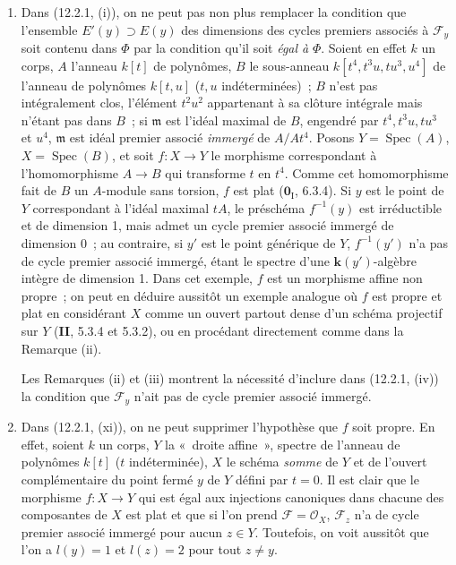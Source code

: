 \begin{remarks}[12.2.3]
\begin{enumerate}[label=(\roman*)]
  \item Dans (12.2.1, (i)), on ne peut pas non plus remplacer la condition que
  l'ensemble $E'(y)\supset E(y)$ des dimensions des cycles premiers associés à
  $\mathcal F_y$ soit contenu dans $\Phi$ par la condition qu'il soit
  \emph{égal à} $\Phi$. Soient en effet $k$ un corps, $A$ l'anneau $k[t]$ de
  polynômes, $B$ le sous-anneau $k[t^4,t^3u,tu^3,u^4]$ de l'anneau de polynômes
  $k[t,u]$ ($t,u$ indéterminées)~; $B$ n'est pas intégralement clos, l'élément
  $t^2u^2$ appartenant à sa clôture intégrale mais n'étant pas dans $B$~; si
  $\mathfrak m$ est l'idéal maximal de $B$, engendré par $t^4,t^3u,tu^3$ et
  $u^4$, $\mathfrak m$ est idéal premier associé \emph{immergé} de $A/At^4$. Posons
  $Y=\operatorname{Spec}(A)$, $X=\operatorname{Spec}(B)$, et soit $f:X\to Y$
  le morphisme correspondant à l'homomorphisme $A\to B$ qui transforme $t$ en
  $t^4$. Comme cet homomorphisme fait de $B$ un $A$-module sans torsion, $f$
  est plat ($\mathbf 0_{\mathrm I}$, 6.3.4). Si $y$ est le point de $Y$
  correspondant à l'idéal maximal $tA$, le préschéma $f^{-1}(y)$ est
  irréductible et de dimension 1, mais admet un cycle premier associé immergé
  de dimension 0~; au contraire, si $y'$ est le point générique de $Y$,
  $f^{-1}(y')$ n'a pas de cycle premier associé immergé, étant le spectre d'une
  $\boldsymbol{k}(y')$-algèbre intègre de dimension 1. Dans cet exemple, $f$ est un morphisme
  affine non propre~; on peut en déduire aussitôt un exemple analogue où $f$
  est propre et plat en considérant $X$ comme un ouvert partout dense d'un
  schéma projectif sur $Y$ (\textbf{II}, 5.3.4 et 5.3.2), ou en procédant
  directement comme dans la Remarque (ii).

  Les Remarques (ii) et (iii) montrent la nécessité d'inclure dans (12.2.1,
  (iv)) la condition que $\mathcal F_y$ n'ait pas de cycle premier associé
  immergé.

  \item Dans (12.2.1, (xi)), on ne peut supprimer l'hypothèse que $f$ soit
  propre. En effet, soient $k$ un corps, $Y$ la «~droite affine~», spectre de
  l'anneau de polynômes $k[t]$ ($t$ indéterminée), $X$ le schéma \emph{somme}
  de $Y$ et de l'ouvert complémentaire du point fermé $y$ de $Y$ défini par
  $t=0$. Il est clair que le morphisme $f:X\to Y$ qui est égal aux injections
  canoniques dans chacune des composantes de $X$ est plat et que si l'on prend
  $\mathcal F=\mathcal O_X$, $\mathcal F_z$ n'a de cycle premier associé
  immergé pour aucun $z\in Y$. Toutefois, on voit aussitôt que l'on a $l(y)=1$
  et $l(z)=2$ pour tout $z\neq y$.


\end{enumerate}
\end{remarks}
